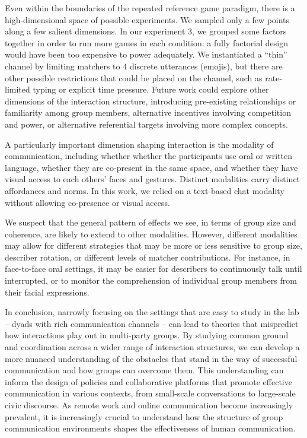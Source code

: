 \documentclass[9pt,twocolumn,twoside]{pnas-new}
\begin{document}
Even within the boundaries of the repeated reference game paradigm,
there is a high-dimensional space of possible experiments. We sampled
only a few points along a few salient dimensions. In our experiment 3,
we grouped some factors together in order to run more games in each
condition: a fully factorial design would have been too expensive to
power adequately. We instantiated a ``thin'' channel by limiting
matchers to 4 discrete utterances (emojis), but there are other possible
restrictions that could be placed on the channel, such as rate-limited
typing or explicit time pressure. Future work could explore other
dimensions of the interaction structure, introducing pre-existing
relationships or familiarity among group members, alternative incentives
involving competition and power, or alternative referential targets
involving more complex concepts.

A particularly important dimension shaping interaction is the modality
of communication, including whether whether the participants use oral or
written language, whether they are co-present in the same space, and
whether they have visual access to each others' faces and gestures.
Distinct modalities carry distinct affordances and norms. In this work,
we relied on a text-based chat modality without allowing co-presence or
visual access.

We suspect that the general pattern of effects we see, in terms of group
size and coherence, are likely to extend to other modalities. However,
different modalities may allow for different strategies that may be more
or less sensitive to group size, describer rotation, or different levels
of matcher contributions. For instance, in face-to-face oral settings,
it may be easier for describers to continuously talk until interrupted,
or to monitor the comprehension of individual group members from their
facial expressions.

In conclusion, narrowly focusing on the settings that are easy to study
in the lab -- dyads with rich communication channels -- can lead to
theories that mispredict how interactions play out in multi-party
groups. By studying common ground and coordination across a wider range
of interaction structures, we can develop a more nuanced understanding
of the obstacles that stand in the way of successful communication and
how groups can overcome them. This understanding can inform the design
of policies and collaborative platforms that promote effective
communication in various contexts, from small-scale conversations to
large-scale civic discourse. As remote work and online communication
become increasingly prevalent, it is increasingly crucial to understand
how the structure of group communication environments shapes the
effectiveness of human communication.
\end{document}
